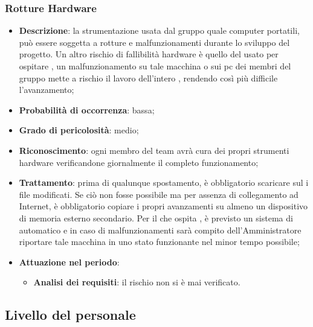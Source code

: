 		\subsubsection{Rotture Hardware}
		\begin{itemize}
			\item \textbf{Descrizione}: la strumentazione usata dal gruppo quale computer portatili, può essere soggetta a rotture e malfunzionamenti durante lo sviluppo del progetto. Un altro rischio di fallibilità hardware è quello del  usato per ospitare 				, un malfunzionamento su tale macchina o sui pc dei membri del gruppo mette a rischio il lavoro dell'intero , rendendo così più difficile l'avanzamento;
			\item \textbf{Probabilità di occorrenza}: bassa;
			\item \textbf{Grado di pericolosità}: medio;
			\item \textbf{Riconoscimento}: ogni membro del team avrà cura dei propri strumenti hardware verificandone giornalmente il completo funzionamento;
			\item \textbf{Trattamento}: prima di qualunque spostamento, è obbligatorio scaricare sul   i file modificati. Se ciò non fosse possibile ma per assenza di collegamento ad Internet, è obbligatorio copiare i propri avanzamenti su 					almeno un dispositivo di memoria esterno secondario. Per il  che ospita , è previsto un sistema di  automatico e in caso di malfunzionamenti sarà compito dell’Amministratore riportare tale macchina in uno stato 				funzionante nel minor tempo possibile; 
			\item \textbf{Attuazione nel periodo}:
			\begin{itemize}
				\item \textbf{Analisi dei requisiti}: il rischio non si è mai verificato.
			\end{itemize}
		\end{itemize}
	\subsection{Livello del personale}
